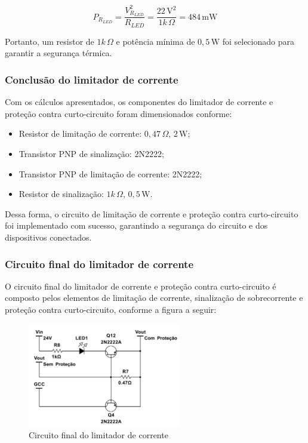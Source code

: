 \[
P_{R_{LED}} = \frac{V_{R_{LED}}^2}{R_{LED}} = \frac{22 \, \text{V}^2}{1k \, \Omega} = 484 \, \text{mW}
\]

Portanto, um resistor de \(1k \, \Omega\) e potência mínima de \(0,5 \, \text{W}\) foi selecionado para garantir a segurança térmica.

\subsubsection*{Conclusão do limitador de corrente}

Com os cálculos apresentados, os componentes do limitador de corrente e proteção contra curto-circuito foram dimensionados conforme:

\begin{itemize}
    \item Resistor de limitação de corrente: \(0,47 \, \Omega, \, 2 \, \text{W}\);
    \item Transistor PNP de sinalização: 2N2222;
    \item Transistor PNP de limitação de corrente: 2N2222;
    \item Resistor de sinalização: \(1k \, \Omega, \, 0,5 \, \text{W}\).
\end{itemize}

Dessa forma, o circuito de limitação de corrente e proteção contra curto-circuito foi implementado com sucesso, garantindo a segurança do circuito e dos dispositivos conectados.

\subsubsection*{Circuito final do limitador de corrente}

O circuito final do limitador de corrente e proteção contra curto-circuito é composto pelos elementos de limitação de corrente, sinalização de sobrecorrente e proteção contra curto-circuito, conforme a figura a seguir:

\begin{figure}[H]
    \centering
    \includegraphics[width=0.6\textwidth]{../imagens/circuito_protecao.png}
    \caption{Circuito final do limitador de corrente}
    \label{fig:protecao}
\end{figure}

